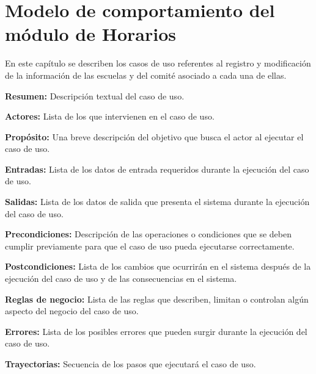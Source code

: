 

\chapter{Modelo de comportamiento del módulo de Horarios}

En este capítulo se describen los casos de uso referentes al registro y modificación de la información de las escuelas y del comité asociado a cada una de ellas. 

\bigskip

     \begin{objetivos}
	\item {\bf Resumen:} Descripción textual del caso de uso.
	\item {\bf Actores:} Lista de los 
	 que intervienen en el caso de uso.
	\item {\bf Propósito:} Una breve descripción del objetivo que busca el actor al ejecutar el caso de uso.
	\item {\bf Entradas:} Lista de los datos de entrada requeridos durante la ejecución del caso de uso.
	\item {\bf Salidas:} Lista de los datos de salida que presenta el sistema durante la ejecución del caso de uso.
	\item {\bf Precondiciones:} Descripción de las operaciones o condiciones que se deben cumplir previamente para que el caso de uso pueda ejecutarse correctamente.
	\item {\bf Postcondiciones:} Lista de los cambios que ocurrirán en el sistema después de la ejecución del caso de uso y de las consecuencias en el sistema.
	\item {\bf Reglas de negocio:} Lista de las reglas que describen, limitan o controlan algún aspecto del negocio del caso de uso.
	\item {\bf Errores:} Lista de los posibles errores que pueden surgir durante la ejecución del caso de uso.
	\item {\bf Trayectorias:} Secuencia de los pasos que ejecutará el caso de uso.
    \end{objetivos}




	
